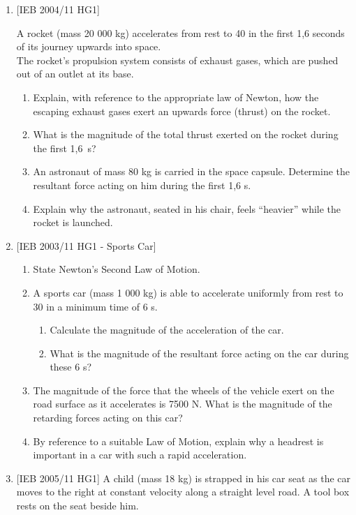 \begin{enumerate}
\item{[IEB 2004/11 HG1]

A rocket (mass 20 000 kg) accelerates from rest to 40 \ms in the first 1,6 seconds of its journey upwards into space.\\
The rocket's propulsion system consists of exhaust gases, which are pushed out of an outlet at its base.
\begin{enumerate}
\item{Explain, with reference to the appropriate law of Newton, how the escaping exhaust gases exert an upwards force (thrust) on the rocket.}
\item{What is the magnitude of the total thrust exerted on the rocket during the first 1,6~s?}
\item{An astronaut of mass 80 kg is carried in the space capsule. Determine the resultant force acting on him during the first 1,6 s.}
\item{Explain why the astronaut, seated in his chair, feels ``heavier'' while the rocket is launched.}
\end{enumerate}}

\item{[IEB 2003/11 HG1 - Sports Car]

\begin{enumerate}
\item{State Newton's Second Law of Motion.}
\item{A sports car (mass 1 000 kg) is able to accelerate uniformly from rest to 30 \ms in a minimum time of 6 s.
\begin{enumerate}
\item{Calculate the magnitude of the acceleration of the car.}
\item{What is the magnitude of the resultant force acting on the car during these 6 s?}
\end{enumerate}}

\item{The magnitude of the force that the wheels of the vehicle exert on the road surface as it accelerates is 7500 N. What is the magnitude of the retarding forces acting on this car?}

\item{By reference to a suitable Law of Motion, explain why a headrest is important in a car with such a rapid acceleration.}
\end{enumerate}}

\item{[IEB 2005/11 HG1]
A child (mass 18 kg) is strapped in his car seat as the car moves to the right at constant velocity along a straight level road. A tool box rests on the seat beside him.

}
\end{enumerate}
